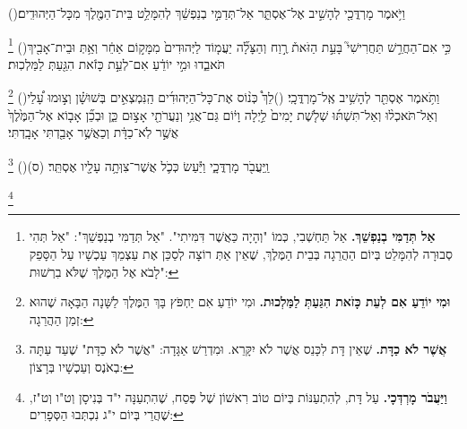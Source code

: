 \documentclass[12pt, openany]{book}
\newcommand{\footnotecomment}[1]{
	\renewcommand\thefootnote{}
	\footnote{\textsf{#1}}}
\newcommand{\commenta}[1]{\footnotecomment{#1}\hspace{0em}}
\newcommand{\vsnum}[1]{(\hebrewnumeral{#1})\space}
\begin{document}
\begin{multicols}{2}
\vsnum{13}וַיֹּ֥אמֶר מָרְדֳּכַ֖י לְהָשִׁ֣יב אֶל־אֶסְתֵּ֑ר אַל־תְּדַמִּ֣י בְנַפְשֵׁ֔ךְ לְהִמָּלֵ֥ט בֵּית־הַמֶּ֖לֶךְ מִכָּל־הַיְּהוּדִֽים׃%
\commenta{\textrm{\textbf{אַל תְּדַמִּי בְנַפְשֵׁךְ.}} אַל תַּחְשְׁבִי, כְּמוֹ "וְהָיָה כַּאֲשֶׁר דִּמִּיתִי". "אַל תְּדַמִּי בְנַפְשֵׁךְ": "אַל תְּהִי סְבוּרָה לְהִמָּלֵט בְּיוֹם הַהֲרֵגָה בְּבֵית הַמֶּלֶךְ, שֶׁאֵין אַתְּ רוֹצָה לְסַכֵּן אֶת עַצְמֵךְ עַכְשָׁיו עַל הַסָּפֵק לָבֹא אֶל הַמֶּלֶךְ שֶׁלֹּא בִרְשׁוּת": }%
\vsnum{14}כִּ֣י אִם־הַחֲרֵ֣שׁ תַּחֲרִישִׁי֮ בָּעֵ֣ת הַזֹּאת֒ רֶ֣וַח וְהַצָּלָ֞ה יַעֲמ֤וֹד לַיְּהוּדִים֙ מִמָּק֣וֹם אַחֵ֔ר וְאַ֥תְּ וּבֵית־אָבִ֖יךְ תֹּאבֵ֑דוּ וּמִ֣י יוֹדֵ֔עַ אִם־לְעֵ֣ת כָּזֹ֔את הִגַּ֖עַתְּ לַמַּלְכֽוּת׃%
\commenta{\textrm{\textbf{וּמִי יוֹדֵעַ אִם לְעֵת כָּזֹאת הִגַּעַתְּ לַמַּלְכוּת.}} וּמִי יוֹדֵעַ אִם יַחְפֹּץ בָּךְ הַמֶּלֶךְ לַשָּׁנָה הַבָּאָה שֶׁהוּא זְמַן הַהֲרֵגָה:}%
\vsnum{15}וַתֹּ֥אמֶר אֶסְתֵּ֖ר לְהָשִׁ֥יב אֶֽל־מָרְדֳּכָֽי׃
\vsnum{16}לֵךְ֩ כְּנ֨וֹס אֶת־כָּל־הַיְּהוּדִ֜ים הַֽנִּמְצְאִ֣ים בְּשׁוּשָׁ֗ן וְצ֣וּמוּ עָ֠לַי וְאַל־תֹּאכְל֨וּ וְאַל־תִּשְׁתּ֜וּ שְׁלֹ֤שֶׁת יָמִים֙ לַ֣יְלָה וָי֔וֹם גַּם־אֲנִ֥י וְנַעֲרֹתַ֖י אָצ֣וּם כֵּ֑ן וּבְכֵ֞ן אָב֤וֹא אֶל־הַמֶּ֙לֶךְ֙ אֲשֶׁ֣ר לֹֽא־כַדָּ֔ת וְכַאֲשֶׁ֥ר אָבַ֖דְתִּי אָבָֽדְתִּי׃%
\commenta{\textrm{\textbf{אֲשֶׁר לֹא כַדָּת.}} שֶׁאֵין דָּת לִכָּנֵס אֲשֶׁר לֹא יִקָּרֵא. וּמִדְרַשׁ אַגָּדָה: "אֲשֶׁר לֹא כַדָּת" שֶׁעַד עַתָּה בְאֹנֶס וְעַכְשָׁיו בְּרָצוֹן: }%
\vsnum{17}וַֽיַּעֲבֹ֖ר מָרְדֳּכָ֑י וַיַּ֕עַשׂ כְּכֹ֛ל אֲשֶׁר־צִוְּתָ֥ה עָלָ֖יו אֶסְתֵּֽר׃ (ס)%
\commenta{\textrm{\textbf{וַיַּעֲבֹר מָרְדְּכָי.}} עַל דָּת, לְהִתְעַנּוֹת בְּיוֹם טוֹב רִאשׁוֹן שֶׁל פֶּסַח, שֶׁהִתְעַנָּה י"ד בְּנִיסָן וְט"ו וְט"ז, שֶׁהֲרֵי בְּיוֹם י"ג נִכְתְּבוּ הַסְּפָרִים: }%
\end{multicols}\newpage
\end{document}
